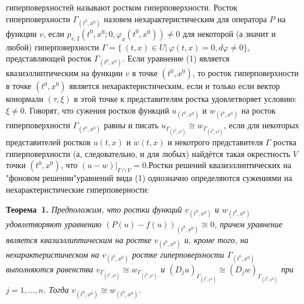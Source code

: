 гиперповерхностей называют ростком гиперповерхности.
Росток гиперповерхности $\Gamma_{(t^0,x^0)}$ назовем нехарактеристическим
для оператора $P$ на функции $v$, если
$p_{v,2}(t^0,x^0;0,\varphi_{x}(t^0,x^0))\not=0$
для некоторой (а значит и любой) гиперповерхности
$\Gamma= \{~(t,x) \in U \vert~\varphi (t,x) =0, d\varphi\not=0\}$, представляющей росток $\Gamma_{(t^0,x^0)}$.
Если уравнение (1) является квазиэллиптическим на функции $v$ в точке $(t^0,x^0)$, то росток гиперповерхности в точке $(t^0,x^0)$ является нехарактеристическим, если и только если вектор конормали $(\tau,\xi)$ в этой точке к представителям ростка удовлетворяет условию: $\xi\not=0$.
Говорят, что сужения ростков функций $u_{(t^0,x^0)}$ и $w_{(t^0,x^0)}$
на росток гиперповерхности $\Gamma_{(t^0,x^0)}$  равны и писать
$u_{\Gamma_{(t^0,x^0)}}\cong w_{\Gamma_{(t^0,x^0)}}$,
если для некоторых представителей ростков $u(t,x)$ и $w(t,x)$   и некотрого представителя $\Gamma$ ростка гиперповерхности (а, следовательно, и для любых)
найдётся такая окрестность $V$ точки $(t^0,x^0)$,
что $(u-w)|_{\Gamma\cap V}=0$.\linebreak Ростки решений квазиэллиптических на "фоновом решении"\linebreak уравнений вида (1) однозначно определяются сужениями на нехарактеристические гиперповерности:


\textbf{Теорема~1.} {\it
Предположим, что ростки функций $v_{(t^0,x^0)}$ и $w_{(t^0,x^0)}$ удовлетворяют уравнению $(P(u)-f(u))_{(t^0,x^0)}\cong 0$, причем уравнение
является квазиэллиптическим на ростке  $v_{(t^0,x^0)}$ и, кроме того, на нехарактеристическом на $v_{(t^0,x^0)}$ ростке гиперповерхности
 $\Gamma_{(t^0,x^0)}$ выполняются равенства
$v_{\Gamma_{(t^0,x^0)}}\cong w_{\Gamma_{(t^0,x^0)}}$ и
$(D_ju)_{\Gamma_{(t^0,x^0)}}\cong (D_jw)_{\Gamma_{(t^0,x^0)}}$ при
$j=1,\dots,n$. Тогда $v_{(t^0,x^0)}\cong w_{(t^0,x^0)}$.
}

